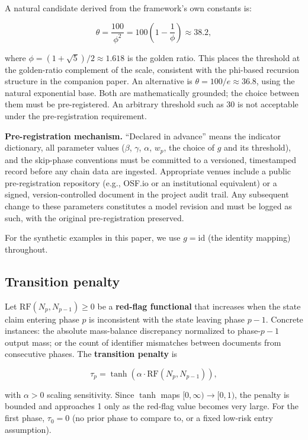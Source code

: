 \documentclass[12pt]{article}
\begin{document}
A natural candidate derived from the framework's own constants is:

\[\theta = \frac{100}{\phi^2} = 100\left(1 - \frac{1}{\phi}\right) \approx 38.2,\]

where \(\phi = (1+\sqrt{5})/2 \approx 1.618\) is the golden ratio. This
places the threshold at the golden-ratio complement of the scale,
consistent with the phi-based recursion structure in the companion
paper. An alternative is \(\theta = 100/e \approx 36.8\), using the
natural exponential base. Both are mathematically grounded; the choice
between them must be pre-registered. An arbitrary threshold such as 30
is not acceptable under the pre-registration requirement.

\textbf{Pre-registration mechanism.} ``Declared in advance'' means the
indicator dictionary, all parameter values (\(\beta\), \(\gamma\),
\(\alpha\), \(w_p\), the choice of \(g\) and its threshold), and the
skip-phase conventions must be committed to a versioned, timestamped
record before any chain data are ingested. Appropriate venues include a
public pre-registration repository (e.g., OSF.io or an institutional
equivalent) or a signed, version-controlled document in the project
audit trail. Any subsequent change to these parameters constitutes a
model revision and must be logged as such, with the original
pre-registration preserved.

For the synthetic examples in this paper, we use \(g = \mathrm{id}\)
(the identity mapping) throughout.

\subsection{Transition penalty}\label{transition-penalty}

Let \(\mathrm{RF}(N_p, N_{p-1}) \geq 0\) be a \textbf{red-flag
functional} that increases when the state claim entering phase \(p\) is
inconsistent with the state leaving phase \(p-1\). Concrete instances:
the absolute mass-balance discrepancy normalized to phase-\(p-1\) output
mass; or the count of identifier mismatches between documents from
consecutive phases. The \textbf{transition penalty} is

\[\tau_p = \tanh\!\left(\alpha \cdot \mathrm{RF}(N_p, N_{p-1})\right),\]

with \(\alpha > 0\) scaling sensitivity. Since \(\tanh\) maps
\([0,\infty) \rightarrow [0,1)\), the penalty is bounded and approaches
1 only as the red-flag value becomes very large. For the first phase,
\(\tau_0 = 0\) (no prior phase to compare to, or a fixed low-risk entry
assumption).
\end{document}

